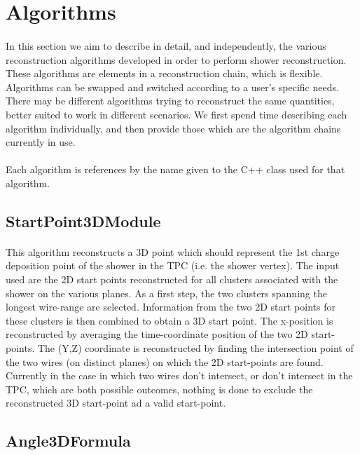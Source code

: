 \section{Algorithms}
\paragraph{}In this section we aim to describe in detail, and independently, the various reconstruction algorithms developed in order to perform shower reconstruction. These algorithms are elements in a reconstruction chain, which is flexible. Algorithms can be swapped and switched according to a user's specific needs. There may be different algorithms trying to reconstruct the same quantities, better suited to work in different scenarios. We first spend time describing each algorithm individually, and then provide those which are the algorithm chains currently in use.
\paragraph{}Each algorithm is references by the name given to the C++ class used for that algorithm.

\subsection{StartPoint3DModule}
\paragraph{}This algorithm reconstructs a 3D point which should represent the 1st charge deposition point of the shower in the TPC (i.e. the shower vertex). The input used are the 2D start points reconstructed for all clusters associated with the shower on the various planes. As a first step, the two clusters spanning the longest wire-range are selected. Information from the two 2D start points for these clusters is then combined to obtain a 3D start point. The x-position is reconstructed by averaging the time-coordinate position of the two 2D start-points. The (Y,Z) coordinate is reconstructed by finding the intersection point of the two wires (on distinct planes) on which the 2D start-points are found. {\color{red} Currently in the case in which two wires don't intersect, or don't intersect in the TPC, which are both possible outcomes, nothing is done to exclude the reconstructed 3D start-point ad a valid start-point.}

\subsection{Angle3DFormula}
